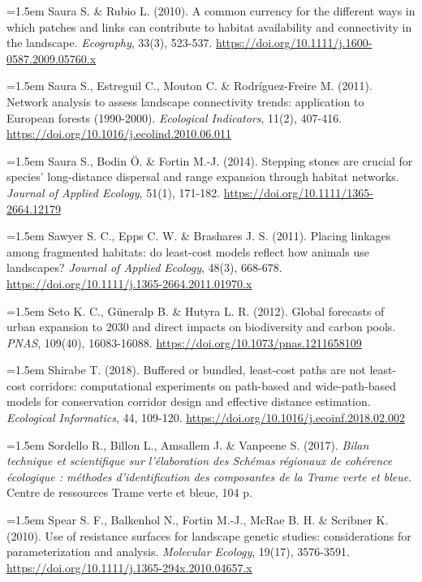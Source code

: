 \documentclass[a4paper,12pt]{report}
\begin{document}
\noindent\hangindent=1.5em Saura S. \& Rubio L. (2010). A common currency for the different ways in which patches and links can contribute to habitat availability and connectivity in the landscape. \textit{Ecography}, 33(3), 523-537. \url{https://doi.org/10.1111/j.1600-0587.2009.05760.x}\par\medskip
\noindent\hangindent=1.5em Saura S., Estreguil C., Mouton C. \& Rodríguez-Freire M. (2011). Network analysis to assess landscape connectivity trends: application to European forests (1990-2000). \textit{Ecological Indicators}, 11(2), 407-416. \url{https://doi.org/10.1016/j.ecolind.2010.06.011}\par\medskip
\noindent\hangindent=1.5em Saura S., Bodin Ö. \& Fortin M.-J. (2014). Stepping stones are crucial for species' long-distance dispersal and range expansion through habitat networks. \textit{Journal of Applied Ecology}, 51(1), 171-182. \url{https://doi.org/10.1111/1365-2664.12179}\par\medskip
\noindent\hangindent=1.5em Sawyer S. C., Epps C. W. \& Brashares J. S. (2011). Placing linkages among fragmented habitats: do least-cost models reflect how animals use landscapes? \textit{Journal of Applied Ecology}, 48(3), 668-678. \url{https://doi.org/10.1111/j.1365-2664.2011.01970.x}\par\medskip
\noindent\hangindent=1.5em Seto K. C., Güneralp B. \& Hutyra L. R. (2012). Global forecasts of urban expansion to 2030 and direct impacts on biodiversity and carbon pools. \textit{PNAS}, 109(40), 16083-16088. \url{https://doi.org/10.1073/pnas.1211658109}\par\medskip
\noindent\hangindent=1.5em Shirabe T. (2018). Buffered or bundled, least-cost paths are not least-cost corridors: computational experiments on path-based and wide-path-based models for conservation corridor design and effective distance estimation. \textit{Ecological Informatics}, 44, 109-120. \url{https://doi.org/10.1016/j.ecoinf.2018.02.002}\par\medskip
\noindent\hangindent=1.5em Sordello R., Billon L., Amsallem J. \& Vanpeene S. (2017). \textit{Bilan technique et scientifique sur l'élaboration des Schémas régionaux de cohérence écologique : méthodes d'identification des composantes de la Trame verte et bleue}. Centre de ressources Trame verte et bleue, 104 p.\par\medskip
\noindent\hangindent=1.5em Spear S. F., Balkenhol N., Fortin M.-J., McRae B. H. \& Scribner K. (2010). Use of resistance surfaces for landscape genetic studies: considerations for parameterization and analysis. \textit{Molecular Ecology}, 19(17), 3576-3591. \url{https://doi.org/10.1111/j.1365-294x.2010.04657.x}\par\medskip
\end{document}
